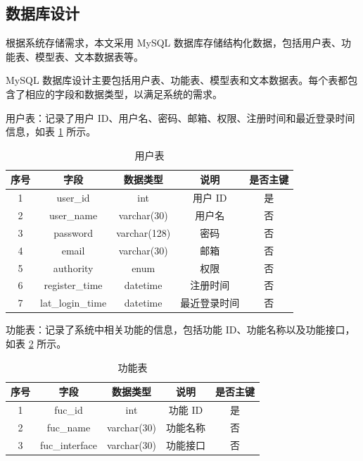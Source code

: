 \subsection{数据库设计}
\label{sec:sys-db}

根据系统存储需求，本文采用 MySQL 数据库存储结构化数据，包括用户表、功能表、模型表、文本数据表等。

MySQL 数据库设计主要包括用户表、功能表、模型表和文本数据表。每个表都包含了相应的字段和数据类型，以满足系统的需求。

用户表：记录了用户 ID、用户名、密码、邮箱、权限、注册时间和最近登录时间信息，如表 \ref{tab:user-table} 所示。

\begin{table}[htb]
    \centering
    \caption{用户表} \label{tab:user-table}
    \begin{tabular}{ccccc}
        \toprule
        \textbf{序号} & \textbf{字段} & \textbf{数据类型} & \textbf{说明} & \textbf{是否主键} \\
        \midrule
        1 & user\_id & int & 用户 ID & 是 \\
        2 & user\_name & varchar(30) & 用户名 & 否 \\
        3 & password & varchar(128) & 密码 & 否 \\
        4 & email & varchar(30) & 邮箱 & 否 \\
        5 & authority & enum & 权限 & 否 \\
        6 & register\_time & datetime & 注册时间 & 否 \\
        7 & lat\_login\_time & datetime & 最近登录时间 & 否 \\
        \bottomrule
    \end{tabular}
\end{table}

功能表：记录了系统中相关功能的信息，包括功能 ID、功能名称以及功能接口，如表 \ref{tab:func-table} 所示。

\begin{table}[htb]
    \centering
    \caption{功能表} \label{tab:func-table}
    \begin{tabular}{ccccc}
        \toprule
        \textbf{序号} & \textbf{字段} & \textbf{数据类型} & \textbf{说明} & \textbf{是否主键} \\
        \midrule
        1 & fuc\_id & int & 功能 ID & 是 \\
        2 & fuc\_name & varchar(30) & 功能名称 & 否 \\
        3 & fuc\_interface & varchar(30) & 功能接口 & 否 \\
        \bottomrule
    \end{tabular}
\end{table}


